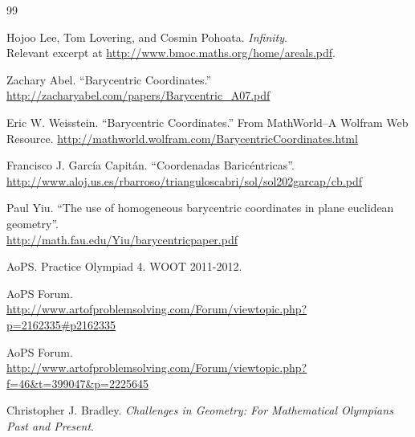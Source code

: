 \begin{thebibliography}{99}
\iflong
\else
\fi

  Hojoo Lee, Tom Lovering, and Cosmin Pohoata.
  \textit{Infinity}. \\
  Relevant excerpt at \url{http://www.bmoc.maths.org/home/areals.pdf}.

  Zachary Abel.
  ``Barycentric Coordinates.'' \\
  \url{http://zacharyabel.com/papers/Barycentric\_A07.pdf}

  Eric W. Weisstein.
  ``Barycentric Coordinates.''
  From MathWorld--A Wolfram Web Resource.
  \url{http://mathworld.wolfram.com/BarycentricCoordinates.html}

  Francisco J. Garc\'ia Capit\'an.
  ``Coordenadas Baric\'entricas''. \\
  \url{http://www.aloj.us.es/rbarroso/trianguloscabri/sol/sol202garcap/cb.pdf}

  Paul Yiu.
  ``The use of homogeneous barycentric coordinates in plane euclidean geometry''. \\
  \url{http://math.fau.edu/Yiu/barycentricpaper.pdf}

  AoPS.  Practice Olympiad 4.  WOOT 2011-2012.

  AoPS Forum.  \\ \url{http://www.artofproblemsolving.com/Forum/viewtopic.php?p=2162335#p2162335}

  AoPS Forum.  \\ \url{http://www.artofproblemsolving.com/Forum/viewtopic.php?f=46&t=399047&p=2225645}

  Christopher J. Bradley.  \textit{Challenges in Geometry: For Mathematical Olympians Past and Present}. \\


\end{thebibliography}
